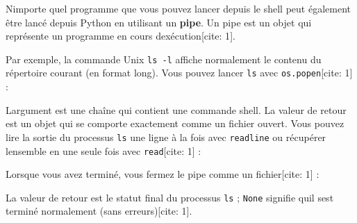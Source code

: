 N\textquotesingle importe quel programme que vous pouvez lancer depuis
le shell peut également être lancé depuis Python en utilisant un
\textbf{pipe}. Un pipe est un objet qui représente un programme en cours
d\textquotesingle exécution{[}cite: 1{]}.

Par exemple, la commande Unix \texttt{ls\ -l} affiche normalement le
contenu du répertoire courant (en format long). Vous pouvez lancer
\texttt{ls} avec \texttt{os.popen}{[}cite: 1{]} :

\begin{Shaded}
\begin{Highlighting}[]
\OperatorTok{\textgreater{}\textgreater{}\textgreater{}}\OperatorTok{=} 
\OperatorTok{\textgreater{}\textgreater{}\textgreater{}}\OperatorTok{=}
\end{Highlighting}
\end{Shaded}

L\textquotesingle argument est une chaîne qui contient une commande
shell. La valeur de retour est un objet qui se comporte exactement comme
un fichier ouvert. Vous pouvez lire la sortie du processus \texttt{ls}
une ligne à la fois avec \texttt{readline} ou récupérer
l\textquotesingle ensemble en une seule fois avec \texttt{read}{[}cite:
1{]} :

\begin{Shaded}
\begin{Highlighting}[]
\OperatorTok{\textgreater{}\textgreater{}\textgreater{}}\OperatorTok{=}
\end{Highlighting}
\end{Shaded}

Lorsque vous avez terminé, vous fermez le pipe comme un fichier{[}cite:
1{]} :

\begin{Shaded}
\begin{Highlighting}[]
\OperatorTok{\textgreater{}\textgreater{}\textgreater{}}\OperatorTok{=}
\OperatorTok{\textgreater{}\textgreater{}\textgreater{}} 
\end{Highlighting}
\end{Shaded}

La valeur de retour est le statut final du processus \texttt{ls} ;
\texttt{None} signifie qu\textquotesingle il s\textquotesingle est
terminé normalement (sans erreurs){[}cite: 1{]}.

